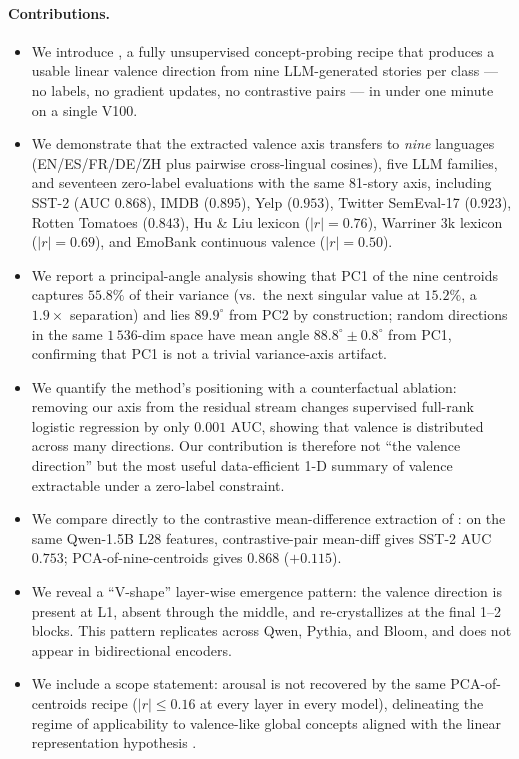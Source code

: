 \paragraph{Contributions.}
\begin{itemize}[leftmargin=*]
\item We introduce \ours, a fully unsupervised concept-probing recipe
that produces a usable linear valence direction from nine LLM-generated
stories per class --- no labels, no gradient updates, no contrastive
pairs --- in under one minute on a single V100.
\item We demonstrate that the extracted valence axis transfers to
\emph{nine} languages (EN/ES/FR/DE/ZH plus pairwise cross-lingual
cosines), five LLM families, and seventeen zero-label evaluations with
the same 81-story axis, including SST-2 (AUC $0.868$), IMDB ($0.895$),
Yelp ($0.953$), Twitter SemEval-17 ($0.923$), Rotten Tomatoes ($0.843$),
Hu \& Liu lexicon ($|r|=0.76$), Warriner 3k lexicon ($|r|=0.69$), and
EmoBank continuous valence ($|r|=0.50$).
\item We report a principal-angle analysis showing that PC1 of the nine
centroids captures $55.8\%$ of their variance (vs.\ the next singular value
at $15.2\%$, a $1.9\times$ separation) and lies $89.9^\circ$ from PC2 by
construction; random directions in the same $1\,536$-dim space have mean
angle $88.8^\circ \pm 0.8^\circ$ from PC1, confirming that PC1 is not a
trivial variance-axis artifact.
\item We quantify the method's positioning with a counterfactual ablation:
removing our axis from the residual stream changes supervised full-rank
logistic regression by only $0.001$ AUC, showing that valence is
distributed across many directions. Our contribution is therefore not
``the valence direction'' but the most useful data-efficient
1-D summary of valence extractable under a zero-label constraint.
\item We compare directly to the contrastive mean-difference extraction
of \cite{zou2023representation, rimsky2024steering, arditi2024refusal}: on
the same Qwen-1.5B L28 features, contrastive-pair mean-diff gives SST-2
AUC $0.753$; PCA-of-nine-centroids gives $0.868$ ($+0.115$).
\item We reveal a ``V-shape'' layer-wise emergence pattern: the valence
direction is present at L1, absent through the middle, and re-crystallizes
at the final 1--2 blocks. This pattern replicates across Qwen, Pythia, and
Bloom, and does not appear in bidirectional encoders.
\item We include a scope statement: arousal is not recovered by the same
PCA-of-centroids recipe ($|r|\leq 0.16$ at every layer in every model),
delineating the regime of applicability to valence-like global concepts
aligned with the linear representation hypothesis
\cite{park2024linear}.
\end{itemize}

